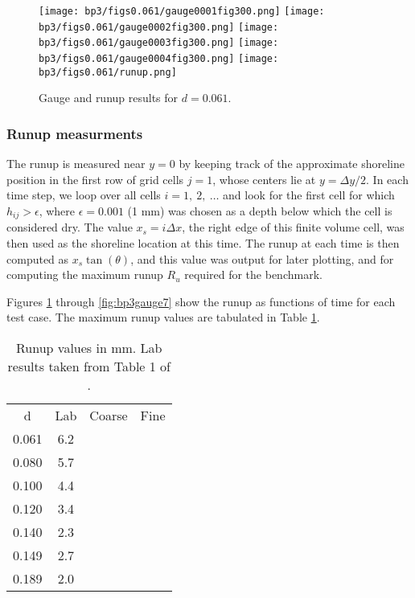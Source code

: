 \begin{figure}[ht]

\hfil\texttt{[image: bp3/figs0.061/gauge0001fig300.png]}\hfil
\hfil\texttt{[image: bp3/figs0.061/gauge0002fig300.png]}\hfil
\vskip 10pt
\hfil\texttt{[image: bp3/figs0.061/gauge0003fig300.png]}\hfil
\hfil\texttt{[image: bp3/figs0.061/gauge0004fig300.png]}\hfil
\vskip 10pt
\hfil\texttt{[image: bp3/figs0.061/runup.png]}\hfil

\caption{\label{fig:bp3gauge1} 
Gauge and runup results for $d=0.061$.
  }
\end{figure}



\subsubsection{Runup measurments}

The runup is measured near $y=0$ by keeping track of the approximate shoreline
position in the first row of grid cells $j=1$, whose centers lie at
$y=\Delta y / 2$.  In each time step, we loop over all cells
$i=1,~2,~\ldots$ and look for the first cell for which $h_{ij} > \epsilon$,
where $\epsilon = 0.001$ (1 mm) was chosen as a depth below which the cell
is considered dry.  
The value $x_s = i\Delta x$, the right edge of this finite volume cell, was
then used as the shoreline location at this time.  The runup at each time
is then computed as $x_s\tan(\theta)$, and this value was output for
later plotting, and for computing the maximum runup $R_u$ required for the
benchmark.

Figures \ref{fig:bp3gauge1} through \ref{fig:bp3gauge7} show the 
runup as functions of time for each test case.  The maximum runup values are
tabulated in Table \ref{fig:bp3runup}.

\begin{table}[ht]
\begin{tabular}{c|c|c|c}
d & Lab & Coarse & Fine \\
0.061&6.2& & \\
0.080&5.7& & \\
0.100&4.4& & \\
0.120&3.4& & \\
0.140&2.3& & \\
0.149&2.7& & \\
0.189&2.0 & & 
\end{tabular}
\caption{\label{fig:bp3runup} 
Runup values in mm.  Lab results taken from Table 1 of
\cite{bp3description}.
  }
\end{table}



